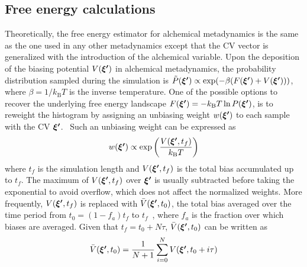 \documentclass[journal=jacsat,manuscript=article]{achemso}
\newcommand{\bfv}[1]{{\mbox{\boldmath{$#1$}}}}
\begin{document}
\subsection{Free energy calculations}
Theoretically, the free energy estimator for alchemical metadynamics is the same as the one used in any other metadynamics except that the CV vector is generalized with the introduction of the alchemical variable. Upon the deposition of the biasing potential $V(\bfv{\xi'})$ in alchemical metadynamics, the probability distribution sampled during the simulation is $\tilde{P}(\bfv{\xi'}) \propto \exp(-\beta(F(\bfv{\xi'}) + V(\bfv{\xi'})))$, where $\beta=1/k_{\text{B}}T$ is the inverse temperature. One of the possible options to recover the underlying free energy landscape $F(\bfv{\xi'})=-k_{\text{B}}T\ln P(\bfv{\xi'})$, is  to reweight the histogram by assigning an unbiasing weight $w(\bfv{\xi'})$ to each sample with the CV $\bfv{\xi'}$.~\cite{branduardi2012metadynamics} Such an unbiasing weight can be expressed as 
\begin{equation}
    w(\bfv{\xi'}) \propto \exp \left(\frac{V(\bfv{\xi'}, t_f)}{k_{\text{B}}T} \right)
\end{equation} where $t_f$ is the simulation length and $V(\bfv{\xi'}, t_f)$ is the total bias accumulated up to $t_f$. The maximum of $V(\bfv{\xi'}, t_f)$ over $\bfv{\xi'}$ is usually subtracted before taking the exponential to avoid overflow, which does not affect the normalized weights. More frequently, $V(\bfv{\xi'}, t_f)$ is replaced with $\bar{V}(\bfv{\xi'}, t_0)$, the total bias averaged over the time period from $t_0 = (1-f_a)t_f$ to $t_f$~\cite{micheletti2004reconstructing}, where $f_a$ is the fraction over which biases are averaged. Given that $t_f = t_0 + N\tau$, $\bar{V}(\bfv{\xi'}, t_0)$ can be written as 
\begin{equation}
    \bar{V}(\bfv{\xi'}, t_0) = \frac{1}{N+1}\sum_{i=0}^{N}V(\bfv{\xi'}, t_0 + i\tau)
\end{equation}
\end{document}
